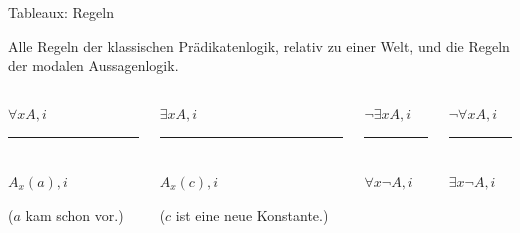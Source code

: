 \documentclass[12pt]{beamer}
\newcommand{\prule}{\vspace{-8pt}\rule{50pt}{0.5pt}}
\begin{document}
\begin{frame}{Tableaux: Regeln}

  Alle Regeln der klassischen Prädikatenlogik, relativ zu einer Welt,
  und die Regeln der modalen Aussagenlogik.

  \pause

  \begin{columns}
    \begin{column}[t]{.25 \linewidth}
      \begin{center}
        $\forall x A, i$ \\
        \prule\\
        $A_x(a), i$
      \end{center}
      ($a$ kam schon vor.)
    \end{column}
    
    \begin{column}[t]{.25 \linewidth}
      \begin{center}
        $\exists x A, i$ \\
        \prule\\
        $A_x(c), i$
      \end{center}
      ($c$ ist eine neue Konstante.)
    \end{column}
    
    \begin{column}[t]{.25 \linewidth}
      \begin{center}
        $\neg \exists x A, i$\\
        \prule\\
        $\forall x \neg A, i$\\
      \end{center}
    \end{column}
    
    \begin{column}[t]{.25 \linewidth}
      \begin{center}
        $\neg \forall x A, i$ \\
        \prule\\
        $\exists x \neg A, i$
      \end{center}
    \end{column}
  \end{columns}

  \pause
  

\end{frame}
\end{document}
